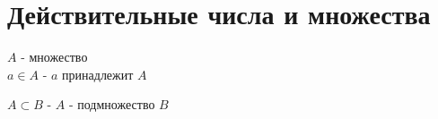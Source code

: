 \section{Действительные числа и множества}

$A$ - множество \\

$ a \in A$ - $a$ принадлежит $A$

$ A \subset B $ - $A$ - подмножество $B$
